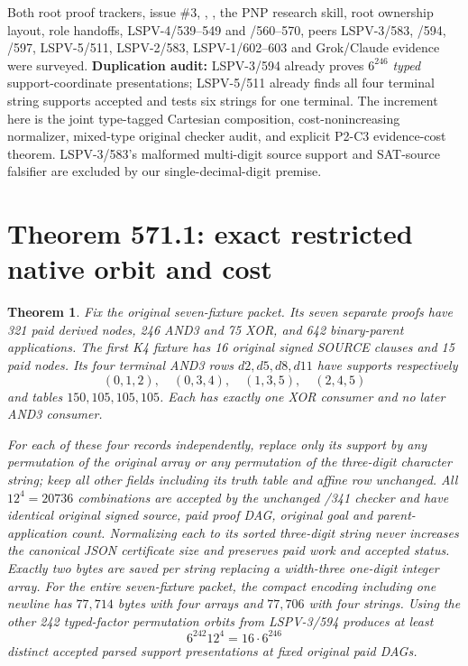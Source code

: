 \documentclass[11pt]{article}
\newtheorem{theorem}{Theorem}
\begin{document}
Both root proof trackers, issue \#3, , , the PNP research skill, root  ownership layout, role handoffs, LSPV-4/539--549 and /560--570, peers LSPV-3/583, /594, /597, LSPV-5/511, LSPV-2/583, LSPV-1/602--603 and Grok/Claude evidence were surveyed. \textbf{Duplication audit:} LSPV-3/594 already proves $6^{246}$ \emph{typed} support-coordinate presentations; LSPV-5/511 already finds all four terminal string supports accepted and tests six strings for one terminal. The increment here is the joint type-tagged Cartesian composition, cost-nonincreasing normalizer, mixed-type original checker audit, and explicit P2-C3 evidence-cost theorem. LSPV-3/583's malformed multi-digit source support and SAT-source falsifier are excluded by our single-decimal-digit premise.

\section*{Theorem 571.1: exact restricted native orbit and cost}
\begin{theorem}
Fix the original seven-fixture packet. Its seven \emph{separate} proofs have 321 paid derived nodes, 246 AND3 and 75 XOR, and 642 binary-parent applications. The first K4 fixture has 16 original signed SOURCE clauses and 15 paid nodes. Its four terminal AND3 rows $d2,d5,d8,d11$ have supports respectively
\[
(0,1,2),\quad (0,3,4),\quad(1,3,5),\quad(2,4,5)
\]
and tables $150,105,105,105$. Each has exactly one XOR consumer and no later AND3 consumer.

For each of these four records independently, replace only its support by any permutation of the original array or any permutation of the three-digit character string; keep all other fields including its truth table and affine row unchanged. All $12^4=20736$ combinations are accepted by the unchanged /341 checker and have identical original signed source, paid proof DAG, original goal and parent-application count. Normalizing each to its sorted three-digit string never increases the canonical JSON certificate size and preserves paid work and accepted status. Exactly two bytes are saved per string replacing a width-three one-digit integer array. For the entire seven-fixture packet, the compact encoding including one newline has $77{,}714$ bytes with four arrays and $77{,}706$ with four strings. Using the other 242 typed-factor permutation orbits from LSPV-3/594 produces at least
\[
\boxed{6^{242}12^4=16\cdot6^{246}}
\]
distinct accepted parsed support presentations at fixed original paid DAGs.
\end{theorem}
\end{document}
